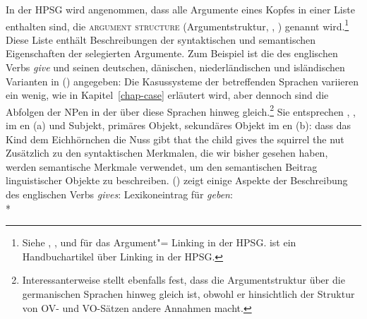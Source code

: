 In der HPSG wird angenommen, dass alle Argumente eines Kopfes in einer Liste enthalten sind, die \textsc{argument
  structure} (Argumentstruktur, \argst, \citealp*{DKW2021a}) genannt wird.\footnote{%
Siehe , ,
 und  für das Argument"=%
Linking in der HPSG.  ist ein Handbuchartikel über Linking in der HPSG.
} Diese Liste enthält Beschreibungen der syntaktischen und semantischen Eigenschaften der
selegierten Argumente. Zum Beispiel ist die \argstl des englischen Verbs \emph{give} und seinen
deutschen, dänischen, niederländischen und isländischen Varianten in () angegeben:
\ea
{}
\z
Die Kasussysteme der betreffenden Sprachen variieren ein wenig, wie in
Kapitel~\ref{chap-case} erläutert wird, aber dennoch sind die Abfolgen der NPen in der \argstl über diese
Sprachen hinweg gleich.\footnote{%
  Interessanterweise stellt \citet[]{Haider2010a} ebenfalls fest, dass die Argumentstruktur
  über die germanischen Sprachen hinweg gleich ist, obwohl er hinsichtlich der Struktur von
  OV- und VO-Sätzen andere Annahmen macht.%
} Sie entsprechen , ,  im en (a) und Subjekt, primäres Objekt, sekundäres Objekt
im en (b):
\eal
\ex dass das Kind dem Eichhörnchen die Nuss gibt
\ex that the child gives the squirrel the nut
\zl
Zusätzlich zu den syntaktischen Merkmalen, die wir bisher gesehen haben, werden semantische Merkmale verwendet, um den
semantischen Beitrag linguistischer Objekte zu beschreiben. () zeigt einige Aspekte der Beschreibung des englischen Verbs
\emph{gives}:
\ea
Lexikoneintrag für \emph{geben}:\\*
\label{le-geben}
